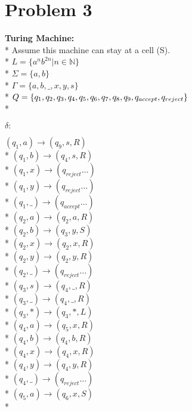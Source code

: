 \documentclass{article}
\begin{document}
\section*{Problem 3}
\begin{multicols}{3}
    \textbf{Turing Machine:} \\*
    Assume this machine can stay at a cell (S).\\*
    $L=\{a^nb^{2n}|n \in \mathbb{N} \}$\\*
    $\Sigma = \{a,b\}$ \\*
    $\Gamma = \{a,b,\_, x, y, s\}$ \\*
    $Q = \{q_1,q_2,q_3,q_4,q_5,q_6,q_7,q_8,q_9,\newline q_{accept},q_{reject}\}$ \\*

    \columnbreak
    $\delta:$
    \begin{addmargin}[1em]{0em}
        $(q_1, a) \rightarrow (q_9, s, R) $\\*
        $(q_1, b) \rightarrow (q_4, s, R) $\\*
        $(q_1, x) \rightarrow (q_{reject}\dots) $\\*
        $(q_1, y) \rightarrow (q_{reject}\dots) $\\*
        $(q_1, \_) \rightarrow (q_{accept}\dots) $\\*
        $(q_2, a) \rightarrow (q_2, a, R) $\\*
        $(q_2, b) \rightarrow (q_3, y, S) $\\*
        $(q_2, x) \rightarrow (q_2, x, R) $\\*
        $(q_2, y) \rightarrow (q_2, y, R) $\\*
        $(q_2, \_) \rightarrow (q_{reject}\dots) $\\*
        $(q_3, s) \rightarrow (q_4, \_, R) $\\*
        $(q_3, \_) \rightarrow (q_4, \_, R) $\\*
        $(q_3, *) \rightarrow (q_3, *, L) $\\*
        $(q_4, a) \rightarrow (q_5, x, R) $\\*
        $(q_4, b) \rightarrow (q_4, b, R) $\\*
        $(q_4, x) \rightarrow (q_4, x, R) $\\*
        $(q_4, y) \rightarrow (q_4, y, R) $\\*
        \columnbreak
        $(q_4, \_) \rightarrow (q_{reject}\dots) $\\*
        $(q_5, a) \rightarrow (q_6, x, S) $\\*

\end{addmargin}
\end{multicols}
\end{document}

